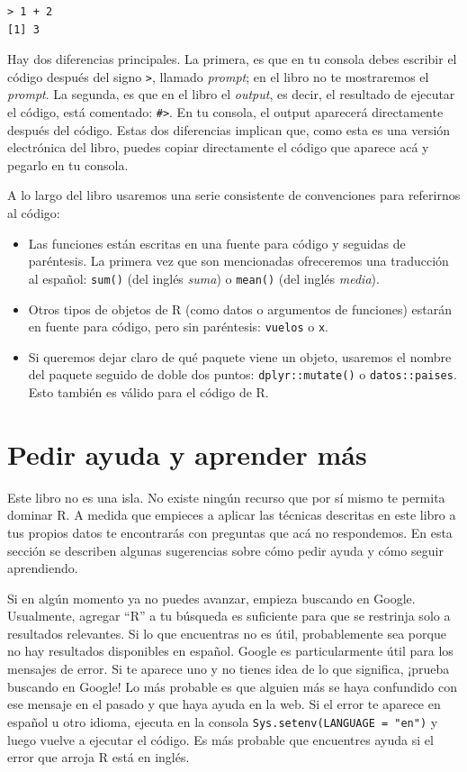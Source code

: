 \documentclass[11pt,oneside]{report}
\begin{document}
\begin{verbatim}
> 1 + 2
[1] 3
\end{verbatim}

Hay dos diferencias principales. La primera, es que en tu consola debes
escribir el código después del signo \texttt{\textgreater{}}, llamado
\emph{prompt}; en el libro no te mostraremos el \emph{prompt}. La
segunda, es que en el libro el \emph{output}, es decir, el resultado de
ejecutar el código, está comentado: \texttt{\#\textgreater{}}. En tu
consola, el output aparecerá directamente después del código. Estas dos
diferencias implican que, como esta es una versión electrónica del
libro, puedes copiar directamente el código que aparece acá y pegarlo en
tu consola.

A lo largo del libro usaremos una serie consistente de convenciones para
referirnos al código:

\begin{itemize}
\item
  Las funciones están escritas en una fuente para código y seguidas de
  paréntesis. La primera vez que son mencionadas ofreceremos una
  traducción al español: \texttt{sum()} (del inglés \emph{suma}) o
  \texttt{mean()} (del inglés \emph{media}).
\item
  Otros tipos de objetos de R (como datos o argumentos de funciones)
  estarán en fuente para código, pero sin paréntesis: \texttt{vuelos} o
  \texttt{x}.
\item
  Si queremos dejar claro de qué paquete viene un objeto, usaremos el
  nombre del paquete seguido de doble dos puntos:
  \texttt{dplyr::mutate()} o \texttt{datos::paises}. Esto también es
  válido para el código de R.
\end{itemize}

\hypertarget{pedir-ayuda-y-aprender-muxe1s}{%
\section{Pedir ayuda y aprender
más}\label{pedir-ayuda-y-aprender-muxe1s}}

Este libro no es una isla. No existe ningún recurso que por sí mismo te
permita dominar R. A medida que empieces a aplicar las técnicas
descritas en este libro a tus propios datos te encontrarás con preguntas
que acá no respondemos. En esta sección se describen algunas sugerencias
sobre cómo pedir ayuda y cómo seguir aprendiendo.

Si en algún momento ya no puedes avanzar, empieza buscando en Google.
Usualmente, agregar ``R'' a tu búsqueda es suficiente para que se
restrinja solo a resultados relevantes. Si lo que encuentras no es útil,
probablemente sea porque no hay resultados disponibles en español.
Google es particularmente útil para los mensajes de error. Si te aparece
uno y no tienes idea de lo que significa, ¡prueba buscando en Google! Lo
más probable es que alguien más se haya confundido con ese mensaje en el
pasado y que haya ayuda en la web. Si el error te aparece en español u
otro idioma, ejecuta en la consola
\texttt{Sys.setenv(LANGUAGE\ =\ "en")} y luego vuelve a ejecutar el
código. Es más probable que encuentres ayuda si el error que arroja R
está en inglés.
\end{document}
